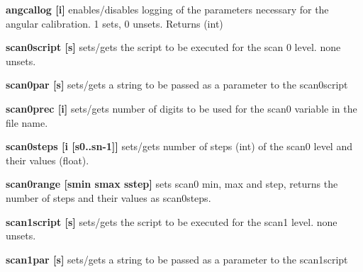 \begin{DoxyItemize}
\item {\bfseries angcallog \mbox{[}i\mbox{]}} enables/disables logging of the parameters necessary for the angular calibration. 1 sets, 0 unsets. {\ttfamily Returns} {\ttfamily }(int)
\end{DoxyItemize}


\begin{DoxyItemize}
\item {\bfseries scan0script \mbox{[}s\mbox{]}} sets/gets the script to be executed for the scan 0 level. {\ttfamily none} unsets.
\end{DoxyItemize}


\begin{DoxyItemize}
\item {\bfseries scan0par \mbox{[}s\mbox{]}} sets/gets a string to be passed as a parameter to the scan0script
\end{DoxyItemize}


\begin{DoxyItemize}
\item {\bfseries scan0prec \mbox{[}i\mbox{]}} sets/gets number of digits to be used for the scan0 variable in the file name.
\end{DoxyItemize}


\begin{DoxyItemize}
\item {\bfseries scan0steps \mbox{[}i \mbox{[}s0..sn-\/1\mbox{]}\mbox{]}} sets/gets number of steps (int) of the scan0 level and their values (float).
\end{DoxyItemize}


\begin{DoxyItemize}
\item {\bfseries scan0range \mbox{[}smin smax sstep\mbox{]}} sets scan0 min, max and step, returns the number of steps and their values as scan0steps.
\end{DoxyItemize}


\begin{DoxyItemize}
\item {\bfseries scan1script \mbox{[}s\mbox{]}} sets/gets the script to be executed for the scan1 level. {\ttfamily none} unsets.
\end{DoxyItemize}


\begin{DoxyItemize}
\item {\bfseries scan1par \mbox{[}s\mbox{]}} sets/gets a string to be passed as a parameter to the scan1script
\end{DoxyItemize}


